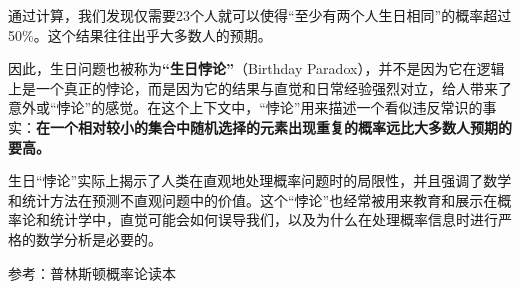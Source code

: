 通过计算，我们发现仅需要23个人就可以使得“至少有两个人生日相同”的概率超过50\%。这个结果往往出乎大多数人的预期。

因此，生日问题也被称为\textbf{“生日悖论”}（Birthday Paradox），并不是因为它在逻辑上是一个真正的悖论，而是因为它的结果与直觉和日常经验强烈对立，给人带来了意外或“悖论”的感觉。在这个上下文中，“悖论”用来描述一个看似违反常识的事实：\textbf{在一个相对较小的集合中随机选择的元素出现重复的概率远比大多数人预期的要高。}

生日“悖论”实际上揭示了人类在直观地处理概率问题时的局限性，并且强调了数学和统计方法在预测不直观问题中的价值。这个“悖论”也经常被用来教育和展示在概率论和统计学中，直觉可能会如何误导我们，以及为什么在处理概率信息时进行严格的数学分析是必要的。

参考：普林斯顿概率论读本